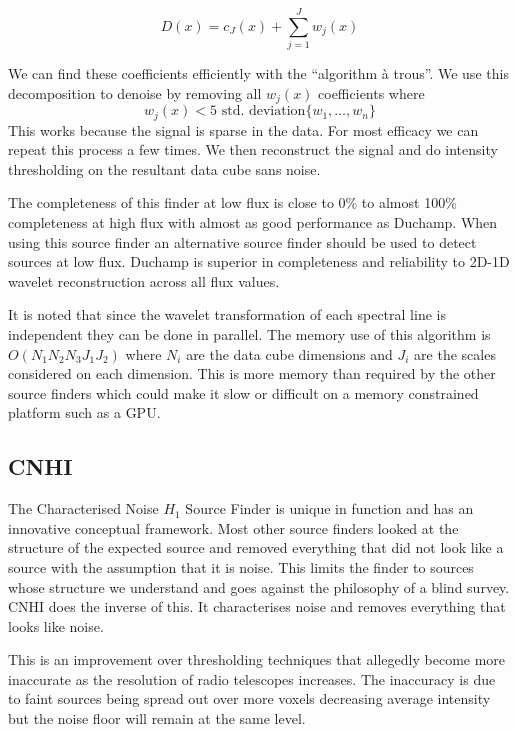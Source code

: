 \documentclass[prodmode,acmtecs]{acmsmall} \usepackage[ruled]{algorithm2e}
\begin{document}
    $$D(x) = c_J(x) + \sum\limits_{j=1}^J w_j(x)$$
    
    We can find these coefficients efficiently with the ``algorithm \`{a} trous''. We
    use this decomposition to denoise by removing all $w_j(x)$ coefficients where
 $$w_j(x) < 5\text{ std. deviation}\{w_1, \ldots, w_n\}$$
    This works because the signal is sparse in the data. For most efficacy we can repeat this
    process a few times. We then reconstruct the signal and do intensity thresholding on the resultant
    data cube sans noise. 
    
    The completeness of this finder at low flux is close to 0\% 
    to almost 100\% completeness at high flux with almost as good performance as Duchamp. When using
    this source finder an alternative source finder should be used to detect sources at low flux. 
    Duchamp is superior in completeness and reliability to 2D-1D wavelet reconstruction across all flux values. \cite{popping2012comparison}
    
    It is noted that since the wavelet transformation of each spectral line is independent they
    can be done in parallel. The memory use of this algorithm is $O(N_1 N_2 N_3 J_1 J_2)$ where $N_i$
    are the data cube dimensions and $J_i$ are the scales considered on each dimension. This is more
    memory than required by the other source finders which could make it slow or difficult on a memory
    constrained platform such as a GPU. 
    
    \cite{floer20122d}

     \subsection{CNHI}
     The Characterised Noise $H_1$ Source Finder is unique in function and has an innovative conceptual framework. Most other 
    source finders looked at the structure of the expected source and
     removed everything that did not look like a source with the assumption that it is noise.
     This limits the finder to sources whose structure we understand and goes against the 
     philosophy of a blind survey. 
     CNHI does the inverse of this. It characterises noise and removes everything that
     looks like noise. \cite{jurek2012characterised}
     
     This is an improvement over thresholding techniques that allegedly become more inaccurate
     as the resolution of radio telescopes increases. The inaccuracy is due to faint sources
     being spread out over more voxels decreasing average intensity but the noise floor will
     remain at the same level. 
     
\end{document}
